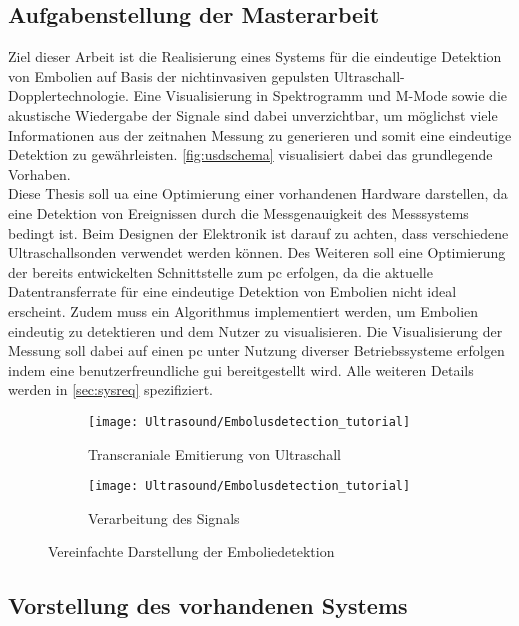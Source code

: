 \subsection{Aufgabenstellung der Masterarbeit}
Ziel dieser Arbeit ist die Realisierung eines Systems für die eindeutige Detektion von Embolien auf Basis der nichtinvasiven gepulsten Ultraschall-Dopplertechnologie. Eine Visualisierung in Spektrogramm und M-Mode sowie die akustische Wiedergabe der Signale sind dabei unverzichtbar, um möglichst viele Informationen aus der zeitnahen Messung zu generieren und somit eine eindeutige Detektion zu gewährleisten. \autoref{fig:usdschema} visualisiert dabei das grundlegende Vorhaben.\\
Diese Thesis soll \ac{ua} eine Optimierung einer vorhandenen Hardware darstellen, da eine Detektion von Ereignissen durch die Messgenauigkeit des Messsystems bedingt ist. Beim Designen der Elektronik ist darauf zu achten, dass verschiedene Ultraschallsonden verwendet werden können. Des Weiteren soll eine Optimierung der bereits entwickelten Schnittstelle zum \ac{pc} erfolgen, da die aktuelle Datentransferrate für eine eindeutige Detektion von Embolien nicht ideal erscheint. Zudem muss ein Algorithmus implementiert werden, um Embolien eindeutig zu detektieren und dem Nutzer zu visualisieren. Die Visualisierung der Messung soll dabei auf einen \ac{pc} unter Nutzung diverser Betriebssysteme erfolgen indem eine benutzerfreundliche \ac{gui} bereitgestellt wird. Alle weiteren Details werden in \autoref{sec:sysreq} spezifiziert.
\begin{figure}[ht]
	\centering
	\begin{subfigure}[b]{0.48\textwidth}
		\centering
  		\texttt{[image: Ultrasound/Embolusdetection\_tutorial]}  
		\caption{Transcraniale Emitierung von Ultraschall}
  	\end{subfigure}
  	\hfill
  	\begin{subfigure}[b]{0.48\textwidth}
	  	\centering
  		\texttt{[image: Ultrasound/Embolusdetection\_tutorial]}
	  	\caption{Verarbeitung des Signals}
  	\end{subfigure}
	\caption[Vereinfachte Darstellung der Emboliedetektion]{Vereinfachte Darstellung der Emboliedetektion\cite[p. 2]{emboli}}
  	\label{fig:usdschema}
\end{figure}
%
%
%

\subsection{Vorstellung des vorhandenen Systems}
